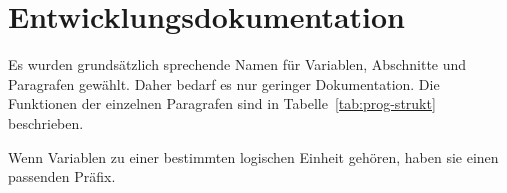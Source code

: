 


\section{Entwicklungsdokumentation}\label{sec:entwicklerdokumentation}


Es wurden grundsätzlich sprechende Namen für Variablen, Abschnitte und Paragrafen gewählt.
Daher bedarf es nur geringer Dokumentation.
Die Funktionen der einzelnen Paragrafen sind in Tabelle~\ref{tab:prog-strukt} beschrieben.

Wenn Variablen zu einer bestimmten logischen Einheit gehören, haben sie einen passenden Präfix.

